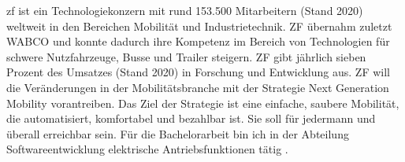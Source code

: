 


\ac{zf} ist ein Technologiekonzern mit rund 153.500 Mitarbeitern (Stand 2020) weltweit in den Bereichen Mobilität
und Industrietechnik. ZF übernahm zuletzt WABCO und konnte dadurch ihre Kompetenz im Bereich von Technologien
für schwere Nutzfahrzeuge, Busse und Trailer steigern. ZF gibt jährlich sieben Prozent des Umsatzes (Stand 2020) in 
Forschung und Entwicklung aus. ZF will die Veränderungen in der Mobilitätsbranche 
mit der
Strategie \glqq Next Generation Mobility\grqq{} vorantreiben. Das Ziel der Strategie ist eine einfache, saubere
Mobilität, die automatisiert, komfortabel und bezahlbar ist. Sie soll für jedermann und überall erreichbar sein.
Für die Bachelorarbeit bin ich in der Abteilung Softwareentwicklung elektrische
Antriebsfunktionen tätig \parencite[]{zf}.

